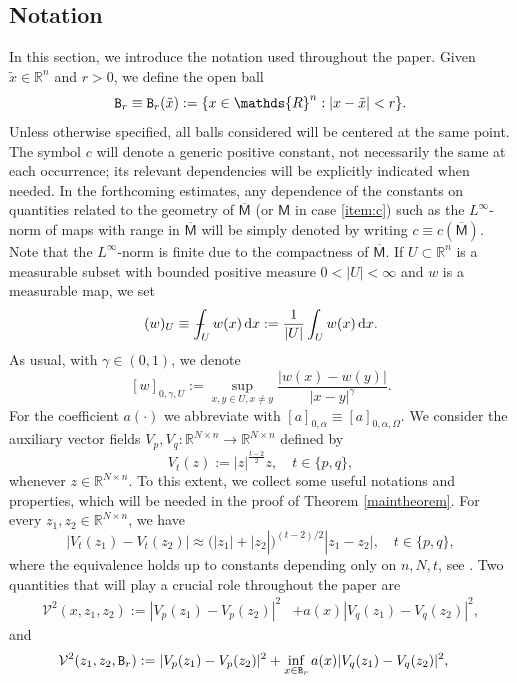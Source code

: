 \documentclass[a4paper]{amsart}
\theoremstyle{plain}  %
\numberwithin{equation}{section}
\newcommand{\mint}{\mathop{\int\hskip -1,05em -\, \!\!\!}\nolimits}
\newcommand{\R}{\mathbb{R}}
\newcommand{\mm}{\mathsf{M}}
\newcommand{\tx}[1]{\textnormal{\texttt{#1}}}
\begin{document}
\subsection{Notation}
\noindent
In this section, we introduce the notation used throughout the paper. Given $\tilde{x} \in \mathds{R}^n$ and $r > 0$, we define the open ball
\[
\tx{B}_r \equiv \tx{B}_r(\tilde{x}) := \{ x \in \mathds{R}^n : |x - \tilde{x}| < r \}.
\]
Unless otherwise specified, all balls considered will be centered at the same point. The symbol $c$ will denote a generic positive constant, not necessarily the same at each occurrence; its relevant dependencies will be explicitly indicated when needed. In the forthcoming estimates, any dependence of the constants on quantities related to the geometry of $\overline{\mm}$ (or $\mm$ in case \ref{item:c}) such as the $L^\infty$-norm of maps with range in $\overline{\mm}$  will be simply denoted by writing $c \equiv c(\overline{\mm})$. Note that the $L^\infty$-norm is finite due to the compactness of $\overline{\mm}$. If $U \subset \R^n$ is a measurable subset with bounded positive measure $0<|U|<\infty$ and $w$ is a measurable map, we set
$$(w)_U \equiv \mint_{U} w(x) \, {\rm d}x := \frac{1}{|U|} \int_U w(x) \, {\rm d}x.$$ 
As usual, with $\gamma \in (0,1)$, we denote
$$ [w]_{0,\gamma,U} := \sup_{x,y \in U, x \neq y}\frac{|w(x) - w(y)|}{|x-y|^\gamma}.$$
For the coefficient $a(\cdot)$ we abbreviate with $[a]_{0,\alpha} \equiv [a]_{0,\alpha,\Omega}$. 
We consider the auxiliary vector fields $V_p, V_q: \R^{N\times n}\to \R^{N\times n}$ defined by
\begin{equation} \label{V1}
    V_{t}(z) := |z|^{\frac{t-2}{2}}z, \quad t\in \{p,q\},
\end{equation}
whenever $z \in \R^{N\times n}$. To this extent, we collect some useful notations and properties, which will be needed in the proof of Theorem \ref{maintheorem}. For every $z_1, z_2 \in \R^{N \times n}$, we have
\begin{equation} \label{v}
    |V_{t}(z_{1})-V_{t}(z_{2})|\approx (|{z_{1}|}+|z_{2}|)^{(t-2)/2}|z_{1}-z_{2}|, \quad t\in \{p,q\},
\end{equation}
where the equivalence holds up to constants depending only on $n,N,t$, see \cite[Lemma 2.1]{Hamburger}. Two quantities that will play a crucial role throughout the paper are
\begin{align*}
    \mathcal{V}^{2}(x,z_1,z_2) := |V_{p}(z_1) - V_{p}(z_2)|^2 & + a(x)|V_{q}(z_1) - V_{q}(z_2)|^2,
\end{align*}
and
\begin{align*} 
        \mathcal{V}^{2}(z_1,z_2, {\tx{B}}_r) := |V_{p}(z_1) - V_{p}(z_2)|^2 & + \inf_{x \in \tx{B}_r}a(x)|V_{q}(z_1) - V_{q}(z_2)|^2,
\end{align*}
\end{document}
